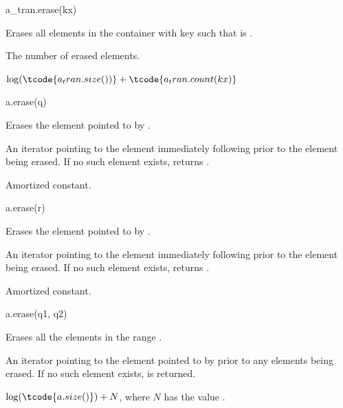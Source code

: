 %
\begin{itemdecl}
a_tran.erase(kx)
\end{itemdecl}

\begin{itemdescr}
\pnum
\result
{}

\pnum
\effects
Erases all elements in the container with key 
such that  is .

\pnum
\returns
The number of erased elements.

\pnum
\complexity
$\log(\tcode{a_tran.size())} + \tcode{a_tran.count(kx)}$
\end{itemdescr}

%
\begin{itemdecl}
a.erase(q)
\end{itemdecl}

\begin{itemdescr}
\pnum
\result
{}

\pnum
\effects
Erases the element pointed to by .

\pnum
\returns
An iterator pointing to the element immediately following 
prior to the element being erased.
If no such element exists, returns .

\pnum
\complexity
Amortized constant.
\end{itemdescr}

%
\begin{itemdecl}
a.erase(r)
\end{itemdecl}

\begin{itemdescr}
\pnum
\result
{}

\pnum
\effects
Erases the element pointed to by .

\pnum
\returns
An iterator pointing to the element immediately following 
prior to the element being erased.
If no such element exists, returns .

\pnum
\complexity
Amortized constant.
\end{itemdescr}

%
\begin{itemdecl}
a.erase(q1, q2)
\end{itemdecl}

\begin{itemdescr}
\pnum
\result
{}

\pnum
\effects
Erases all the elements in the range .

\pnum
\returns
An iterator pointing to the element pointed to by 
prior to any elements being erased.
If no such element exists,  is returned.

\pnum
\complexity
$\log(\tcode{a.size()}) + N$, where $N$ has the value .
\end{itemdescr}

